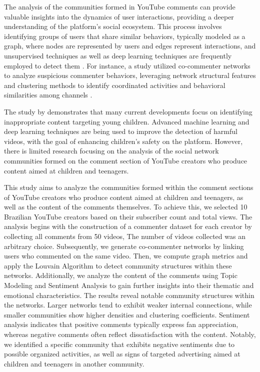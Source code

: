 \documentclass[12pt]{article}
\begin{document}
The analysis of the communities formed in YouTube comments can provide valuable 
insights into the dynamics of user interactions, providing a deeper understanding of 
the platform's social ecosystem. This process involves identifying groups of users that share similar
behaviors, typically modeled as a graph, where nodes are represented by users and edges represent 
interactions, and unsupervised techniques as well as deep learning techniques are frequently employed 
to detect them \cite{nooribakhsh2024community}. For instance, a study utilized co-commenter networks 
to analyze suspicious commenter behaviors, leveraging network structural features and clustering 
methods to identify coordinated activities and behavioral similarities among channels \cite{shajari2023} .

The study by \cite{app13064044} demonstrates that many current developments focus on identifying
inappropriate content targeting young children. Advanced machine learning and deep learning 
techniques are being used to improve the detection of harmful videos, with the goal of enhancing 
children's safety on the platform. However, there is limited research focusing on the analysis of 
the social network communities formed on the comment section of YouTube creators who 
produce content aimed at children and teenagers.

This study aims to analyze the communities formed within the comment sections of YouTube creators who 
produce content aimed at children and teenagers, as well as the content of the comments themselves. 
To achieve this, we selected 10 Brazilian YouTube creators based on their 
subscriber count and total views. The analysis begins with the construction of a commenter dataset for 
each creator by collecting all comments from 50 videos, The number of videos collected was an arbitrary choice. 
Subsequently, we generate co-commenter networks 
by linking users who commented on the same video. Then, we compute graph metrics and apply the 
Louvain Algorithm to detect community structures within these networks. Additionally, we analyze the 
content of the comments using Topic Modeling and Sentiment Analysis to gain further 
insights into their thematic and emotional characteristics. 
The results reveal notable community structures within the networks. Larger networks tend to exhibit 
weaker internal connections, while smaller communities show higher densities and clustering coefficients. 
Sentiment analysis indicates that positive comments typically express fan appreciation, whereas negative 
comments often reflect dissatisfaction with the content. 
Notably, we identified a specific community that exhibits negative sentiments due 
to possible organized activities, as well as signs of targeted advertising aimed at children and teenagers 
in another community. 
\end{document}
